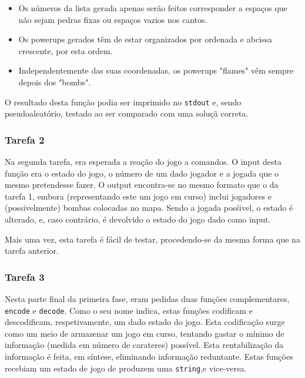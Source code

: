 \documentclass[a4paper]{article}
\begin{document}
    \begin{itemize}
      \item Os números da lista gerada apenas serão feitos corresponder a espaços que não sejam
            pedras fixas ou espaços vazios nos cantos.
      \item Os powerups gerados têm de estar organizados por ordenada e abcissa crescente, por esta 
            ordem.
      \item Independentemente das suas coordenadas, os powerups "flames" vêm sempre depois dos "bombs".
    \end{itemize}
    
    O resultado desta função podia ser imprimido no \texttt{stdout} e, sendo pseudoaleatório, testado
    ao ser comparado com uma soluçã correta.

\subsubsection{Tarefa 2}

    \hspace{0.54cm}Na segunda tarefa, era esperada a reação do jogo a comandos. O input desta função era o estado
    do jogo, o número de um dado jogador e a jogada que o mesmo pretendesse fazer. O output encontra-se
    no mesmo formato que o da tarefa 1, embora (representando este um jogo em curso) inclui jogadores
    e (possivelmente) bombas colocadas no mapa. Sendo a jogada posśivel, o estado é alterado, e,
    caso contrário, é devolvido o estado do jogo dado como input.

    Mais uma vez, esta tarefa é fácil de testar, procedendo-se da mesma forma que na tarefa anterior.

\subsubsection{Tarefa 3}
    \hspace{0.54cm}Nesta parte final da primeira fase, eram pedidas duas funções complementares, \texttt{encode} e 
    \texttt{decode}. Como o seu nome indica, estas funções codificam e descodificam, respetivamente,
    um dado estado do jogo. Esta codificação surge como um meio de armazenar um jogo em curso, tentando
    gastar o mínimo de informação (medida em número de carateres) possível. Esta rentabilização da 
    informação é feita, em síntese, eliminando informação reduntante.
    Estas funções recebiam um estado de jogo de produzem uma \texttt{string},e  vice-versa.
\end{document}
